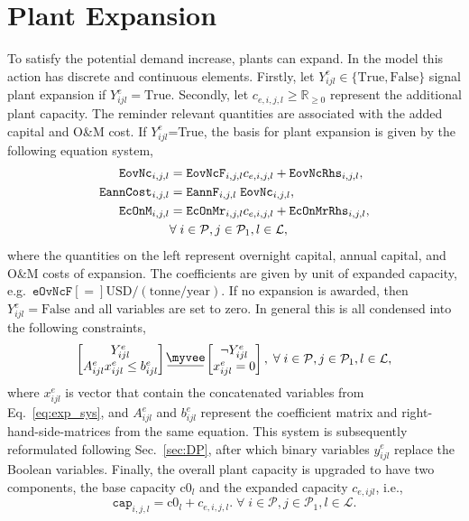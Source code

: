 \documentclass{amsbook}
\newcommand{\myveebar}{\mathbin{\vcenter{\hbox{$ \underline{\mkern-2.4mu{\myvee}\mkern-2.4mu} $}}}}
\begin{document}
\section{Plant Expansion}
%
To satisfy the potential demand increase, plants can expand. In the model this
action has discrete and continuous elements. Firstly, let 
$Y^e_{ijl}\in\{\text{True}, \text{False}\}$ signal plant expansion if $Y^e_{ijl} 
= \text{True}$. Secondly, let $c_{e,i,j,l} \geq \mathbb{R}_{\geq 0}$ represent
the additional plant capacity. The reminder relevant quantities are associated
with the added capital and O\&M cost. 
If $Y^e_{ijl}$=True, the basis for plant expansion is given by the following
equation system,
%
\begin{align}\label{eq:exp_sys}
    \mathtt{EovNc}_{i,j,l} &= \mathtt{EovNcF}_{i,j,l} c_{e,i,j,l} 
    + \mathtt{EovNcRhs}_{i,j,l}, \\
    \mathtt{EannCost}_{i,j,l} &= 
    \mathtt{EannF}_{i,j,l}\; \mathtt{EovNc}_{i,j,l},\\
    \mathtt{EcOnM}_{i,j,l} &= 
    \mathtt{EcOnMr}_{i,j,l} c_{e,i,j,l} + \mathtt{EcOnMrRhs}_{i,j,l}, \\
    & \forall \; i \in \mathcal{P},j \in \mathcal{P}_1 ,
    l \in \mathcal{L}, \notag
\end{align}
%
where the quantities on the left represent overnight capital, annual capital,
and O\&M costs of expansion. The coefficients are given by unit of expanded
capacity, e.g.\ $\mathtt{eOvNcF} \left[=\right] \text{USD}/(\text{tonne/year})$.
If no expansion is awarded, then $Y^e_{ijl}=\text{False}$ and all variables are
set to zero. In general this is all condensed into the following constraints,
%
\begin{equation}\label{eq:dp_exp}
    \begin{bmatrix}
        Y^e_{ijl} \\
        A^e_{ijl} x^e_{ijl} \leq b^e_{ijl}
    \end{bmatrix}
    \myveebar
    \begin{bmatrix}
        \neg Y^e_{ijl} \\
        x^e_{ijl} = 0
    \end{bmatrix},
    \; \forall \; i \in \mathcal{P},j \in \mathcal{P}_1 ,
    l \in \mathcal{L},
\end{equation}
%
where $x^e_{ijl}$ is vector that contain the concatenated variables from
Eq.~\eqref{eq:exp_sys}, and  $A^e_{ijl}$ and $b^e_{ijl}$ represent the
coefficient matrix and right-hand-side-matrices from the same equation. This
system is subsequently reformulated following Sec.~\ref{sec:DP}, after which
binary variables $y^e_{ijl}$ replace the Boolean variables.
Finally, the overall plant capacity is upgraded to have two components, the base
capacity $\text{c0}_l$ and the expanded capacity $c_{e,ijl}$, i.e.,
%
\begin{equation}
    \mathtt{cap}_{i,j,l} = \text{c0}_{l} + c_{e,i,j,l}.
    \; \forall \; i \in \mathcal{P},j \in \mathcal{P}_1 ,
    l \in \mathcal{L}.
\end{equation}
%
\end{document}
